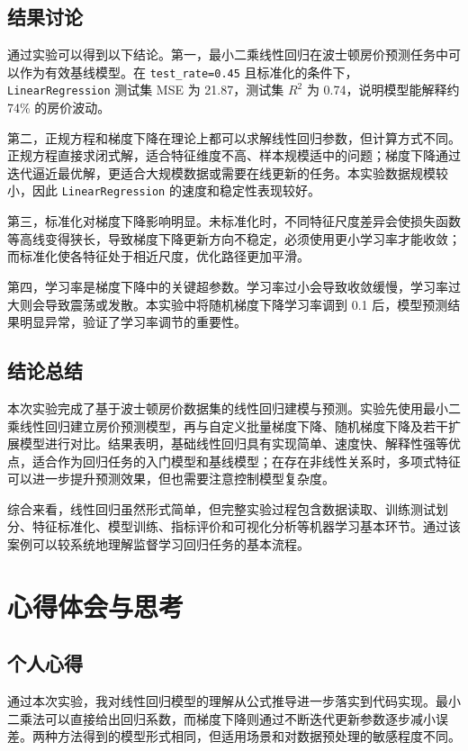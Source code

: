 \documentclass[UTF8,a4paper,12pt]{ctexart}
\begin{document}
\subsection{结果讨论}

通过实验可以得到以下结论。第一，最小二乘线性回归在波士顿房价预测任务中可以作为有效基线模型。在 \texttt{test\_rate=0.45} 且标准化的条件下，\texttt{LinearRegression} 测试集 MSE 为 21.87，测试集 $R^2$ 为 0.74，说明模型能解释约 74\% 的房价波动。

第二，正规方程和梯度下降在理论上都可以求解线性回归参数，但计算方式不同。正规方程直接求闭式解，适合特征维度不高、样本规模适中的问题；梯度下降通过迭代逼近最优解，更适合大规模数据或需要在线更新的任务。本实验数据规模较小，因此 \texttt{LinearRegression} 的速度和稳定性表现较好。

第三，标准化对梯度下降影响明显。未标准化时，不同特征尺度差异会使损失函数等高线变得狭长，导致梯度下降更新方向不稳定，必须使用更小学习率才能收敛；而标准化使各特征处于相近尺度，优化路径更加平滑。

第四，学习率是梯度下降中的关键超参数。学习率过小会导致收敛缓慢，学习率过大则会导致震荡或发散。本实验中将随机梯度下降学习率调到 0.1 后，模型预测结果明显异常，验证了学习率调节的重要性。

\subsection{结论总结}

本次实验完成了基于波士顿房价数据集的线性回归建模与预测。实验先使用最小二乘线性回归建立房价预测模型，再与自定义批量梯度下降、随机梯度下降及若干扩展模型进行对比。结果表明，基础线性回归具有实现简单、速度快、解释性强等优点，适合作为回归任务的入门模型和基线模型；在存在非线性关系时，多项式特征可以进一步提升预测效果，但也需要注意控制模型复杂度。

综合来看，线性回归虽然形式简单，但完整实验过程包含数据读取、训练测试划分、特征标准化、模型训练、指标评价和可视化分析等机器学习基本环节。通过该案例可以较系统地理解监督学习回归任务的基本流程。

\section{心得体会与思考}

\subsection{个人心得}

通过本次实验，我对线性回归模型的理解从公式推导进一步落实到代码实现。最小二乘法可以直接给出回归系数，而梯度下降则通过不断迭代更新参数逐步减小误差。两种方法得到的模型形式相同，但适用场景和对数据预处理的敏感程度不同。
\end{document}
